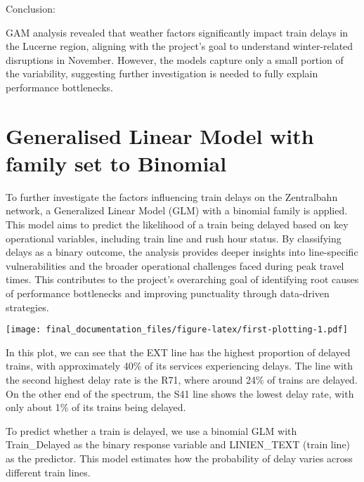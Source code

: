 \documentclass[
]{article}
\begin{document}
Conclusion:

GAM analysis revealed that weather factors significantly impact train
delays in the Lucerne region, aligning with the project's goal to
understand winter-related disruptions in November. However, the models
capture only a small portion of the variability, suggesting further
investigation is needed to fully explain performance bottlenecks.

\section{Generalised Linear Model with family set to
Binomial}\label{generalised-linear-model-with-family-set-to-binomial}

To further investigate the factors influencing train delays on the
Zentralbahn network, a Generalized Linear Model (GLM) with a binomial
family is applied. This model aims to predict the likelihood of a train
being delayed based on key operational variables, including train line
and rush hour status. By classifying delays as a binary outcome, the
analysis provides deeper insights into line-specific vulnerabilities and
the broader operational challenges faced during peak travel times. This
contributes to the project's overarching goal of identifying root causes
of performance bottlenecks and improving punctuality through data-driven
strategies.

\texttt{[image: final\_documentation\_files/figure-latex/first-plotting-1.pdf]}

In this plot, we can see that the EXT line has the highest proportion of
delayed trains, with approximately 40\% of its services experiencing
delays. The line with the second highest delay rate is the R71, where
around 24\% of trains are delayed. On the other end of the spectrum, the
S41 line shows the lowest delay rate, with only about 1\% of its trains
being delayed.

To predict whether a train is delayed, we use a binomial GLM with
Train\_Delayed as the binary response variable and LINIEN\_TEXT (train
line) as the predictor. This model estimates how the probability of
delay varies across different train lines.
\end{document}
